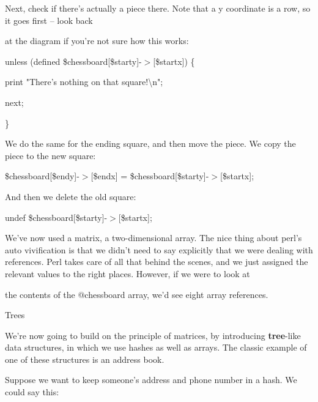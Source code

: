 \documentclass[a4paper,11pt]{book}
\begin{document}
\noindent 

\noindent Next, check if there's actually a piece there. Note that a y coordinate is a row, so it goes first -- look back

\noindent at the diagram if you're not sure how this works:

\noindent 

\noindent 

\noindent unless (defined \$chessboard[\$starty]-$>$[\$startx]) \{

\noindent print "There's nothing on that square!\textbackslash n";

\noindent next;

\noindent \}

\noindent 

\noindent We do the same for the ending square, and then move the piece. We copy the piece to the new square:

\noindent 

\noindent 

\noindent \$chessboard[\$endy]-$>$[\$endx] = \$chessboard[\$starty]-$>$[\$startx];

\noindent 

\noindent And then we delete the old square:

\noindent 

\noindent undef \$chessboard[\$starty]-$>$[\$startx];

\noindent 

\noindent We've now used a matrix, a two-dimensional array. The nice thing about perl's auto vivification is that we didn't need to say explicitly that we were dealing with references. Perl takes care of all that behind the scenes, and we just assigned the relevant values to the right places. However, if we were to look at

\noindent the contents of the @chessboard array, we'd see eight array references.

\noindent 

\noindent Trees

\noindent 

\noindent We're now going to build on the principle of matrices, by introducing \textbf{tree}-like data structures, in which we use hashes as well as arrays. The classic example of one of these structures is an address book.

\noindent Suppose we want to keep someone's address and phone number in a hash. We could say this:

\noindent 
\end{document}
